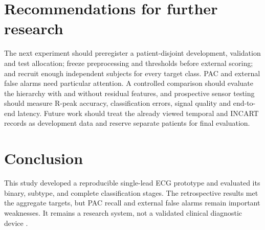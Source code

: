 \section{Recommendations for further research}
The next experiment should preregister a patient-disjoint development,
validation and test allocation; freeze preprocessing and thresholds before
external scoring; and recruit enough independent subjects for every target
class. PAC and external false alarms need particular attention. A controlled
comparison should evaluate the hierarchy with and without residual features,
and prospective sensor testing should measure R-peak accuracy, classification
errors, signal quality and end-to-end latency. Future work should treat the already viewed temporal and INCART records as
development data and reserve separate patients for final evaluation.

\section{Conclusion}
This study developed a reproducible single-lead ECG prototype and evaluated
its binary, subtype, and complete classification stages. The retrospective
results met the aggregate targets, but PAC recall and external false alarms
remain important weaknesses. It remains a research system, not a
validated clinical diagnostic device \cite{collins2024tripodai}.
